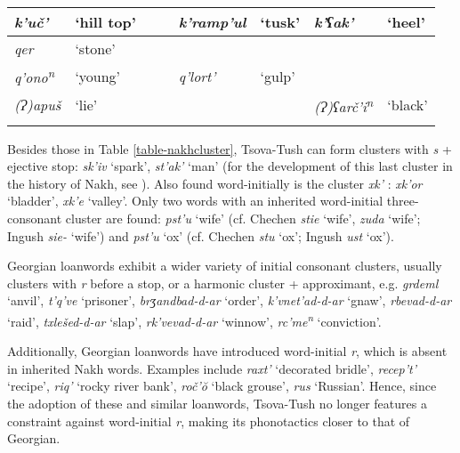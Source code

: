 \begin{sidewaystable}
\begin{tabular}{llllllll}
		\textit{k'uč'} & `hill top' & & & \textit{k'ramp'ul} &  `tusk' & \textit{k'ʕak'} & `heel' \\
		
		\midrule
		
		\textit{qer} & `stone'  \\
		
		\textit{q'ono\textsuperscript{n}} & `young' & & & \textit{q'lort'} & `gulp' &  \\
		
		\textit{(Ɂ)apuš} & `lie' & & & & & \textit{(Ɂ)ʕarč'i\textsuperscript{n}} & `black' \\ 
		\lspbottomrule
		
	\end{tabular}
	\caption{Tsova-Tush inherited word-initial consonants}
	\label{table-nakhcluster}
\end{sidewaystable}

Besides those in Table \ref{table-nakhcluster}, Tsova-Tush can form clusters with \textit{s} + ejective stop: \textit{sk'iv} `spark', \textit{st'ak'} `man' (for the development of this last cluster in the history of Nakh, see \cites[219--220]{nichols03cc}). Also found word-initially is the cluster \textit{xk'} : 
\textit{xk'or} `bladder', \textit{xk'e} `valley'. Only two words with an inherited word-initial three-consonant cluster are found: \textit{pst'u} `wife' (cf. Chechen \textit{stie} `wife', \textit{zuda} `wife'; Ingush \textit{sie-} `wife') and \textit{pst'u} `ox' (cf. Chechen \textit{stu} `ox'; Ingush \textit{ust} `ox').

Georgian loanwords exhibit a wider variety of initial consonant clusters, usually clusters with \textit{r} before a stop, or a harmonic cluster + approximant, e.g. \textit{grdeml} `anvil', \textit{t'q've} `prisoner', \textit{brʒandbad-d-ar} `order', \textit{k'vnet'ad-d-ar} `gnaw', \textit{rbevad-d-ar} `raid', \textit{txlešed-d-ar} `slap', \textit{rk'vevad-d-ar} `winnow', \textit{rc'me\textsuperscript{n}} `conviction'.

Additionally, Georgian loanwords have introduced word-initial \textit{r}, which is absent in inherited Nakh words. Examples include \textit{raxt'} `decorated bridle', \textit{recep't'} `recipe', \textit{riq'} `rocky river bank', \textit{roč'\u{o}} `black grouse', \textit{rus} `Russian'. Hence, since the adoption of these and similar loanwords, Tsova-Tush no longer features a constraint against word-initial \textit{r}, making its phonotactics closer to that of Georgian.



